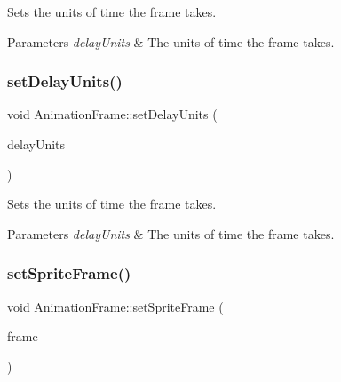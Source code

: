 Sets the units of time the frame takes.


\begin{DoxyParams}{Parameters}
{\em delay\+Units} & The units of time the frame takes. \\
\hline
\end{DoxyParams}
\mbox{\label{classAnimationFrame_afb9b22fd6b69fe33245df07fec1ce125}} 
\subsubsection{\texorpdfstring{set\+Delay\+Units()}{setDelayUnits()}\hspace{0.1cm}{\footnotesize\ttfamily [2/2]}}
{\footnotesize\ttfamily void Animation\+Frame\+::set\+Delay\+Units (\begin{DoxyParamCaption}\item[{float}]{delay\+Units }\end{DoxyParamCaption})\hspace{0.3cm}{\ttfamily [inline]}}

Sets the units of time the frame takes.


\begin{DoxyParams}{Parameters}
{\em delay\+Units} & The units of time the frame takes. \\
\hline
\end{DoxyParams}
\mbox{\label{classAnimationFrame_afd21a7ef4ceb50204e79ed6e6ac80530}} 
\subsubsection{\texorpdfstring{set\+Sprite\+Frame()}{setSpriteFrame()}\hspace{0.1cm}{\footnotesize\ttfamily [1/2]}}
{\footnotesize\ttfamily void Animation\+Frame\+::set\+Sprite\+Frame (\begin{DoxyParamCaption}\item[{\hyperlink{classSpriteFrame}{Sprite\+Frame} $\ast$}]{frame }\end{DoxyParamCaption})\hspace{0.3cm}{\ttfamily [inline]}}

